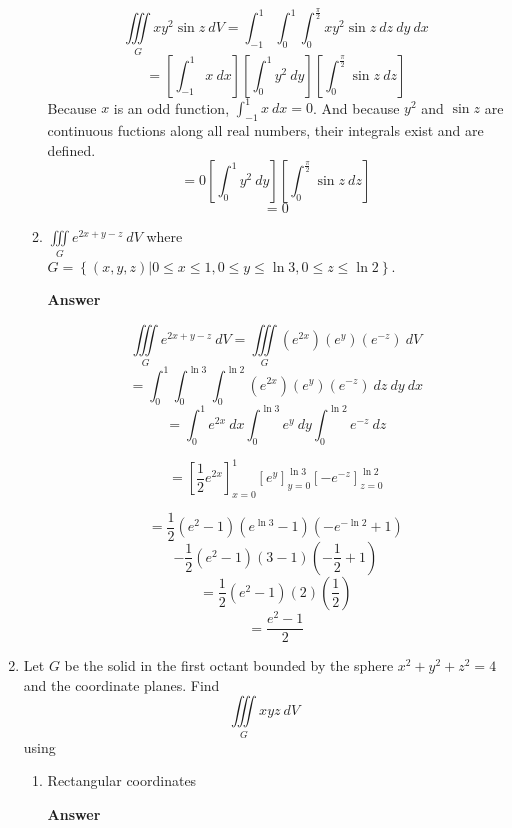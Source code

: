 \documentclass[12pt, letterpaper]{article}
\begin{document}
\begin{enumerate}
\begin{enumerate}
        \[\iiint\limits_G xy^2 \sin z\ dV
        = \int_{-1}^{1} \int_{0}^{1} \int_{0}^{\frac{\pi}{2}} xy^2 \sin z\ dz\ dy\ dx\]
        \[ =
        \left[\int_{-1}^{1} x\ dx\right]
        \left[\int_{0}^{1} y^2\ dy\right]
        \left[\int_{0}^{\frac{\pi}{2}} \sin z\ dz\right]\]
        Because $x$ is an odd function, $\displaystyle \int_{-1}^{1} x\ dx = 0$.
        And because $y^2$ and $\sin z$ are continuous fuctions along all real numbers,
        their integrals exist and are defined.
        \[ = 0 \left[\int_{0}^{1} y^2\ dy\right]
        \left[\int_{0}^{\frac{\pi}{2}} \sin z\ dz\right]\]
        \[ = 0\]

        \item $\displaystyle \iiint\limits_G e^{2x + y - z}\ dV$
        where $\displaystyle G = \left\{(x, y, z) |
        0 \le x \le 1,
        0 \le y \le \ln 3,
        0 \le z \le \ln 2 \right\}$.

        \textbf{Answer}

        \[\iiint\limits_G e^{2x + y - z}\ dV = \iiint\limits_G
        \left(e^{2x}\right)
        \left(e^{y}\right)
        \left(e^{-z}\right)
        \ dV
        \]
        \[ = \int_{0}^{1} \int_{0}^{\ln 3} \int_{0}^{\ln 2}
        \left(e^{2x}\right)
        \left(e^{y}\right)
        \left(e^{-z}\right)
        \ dz\ dy\ dx
        \]
        \[=
        \int_{0}^{1} e^{2x}\ dx
        \int_{0}^{\ln 3} e^{y}\ dy
        \int_{0}^{\ln 2} e^{-z}\ dz\]

        \[=
        \left[\frac{1}{2} e^{2x}\right]_{x=0}^1
        \left[e^y\right]_{y=0}^{\ln 3}
        \left[-e^{-z}\right]_{z=0}^{\ln 2}\]

        \[ = \frac{1}{2}(e^2 - 1) \left(e^{\ln 3} - 1\right) \left(-e^{-\ln 2} + 1\right)\]
        \[ - \frac{1}{2}(e^2 - 1) (3 - 1)\left(-\frac{1}{2} + 1\right)\]
        \[ = \frac{1}{2}(e^2 - 1)(2)\left(\frac{1}{2}\right)\]
        \[ = \frac{e^2 - 1}{2}\]
      \end{enumerate}

      \item Let $G$ be the solid in the first octant bounded by the sphere
      $x^2 + y^2 + z^2 = 4$
      and the coordinate planes. Find
      \[\iiint\limits_G xyz\ dV\]
      using
      \begin{enumerate}
        \item Rectangular coordinates

        \textbf{Answer}


\end{enumerate}
\end{enumerate}
\end{document}
